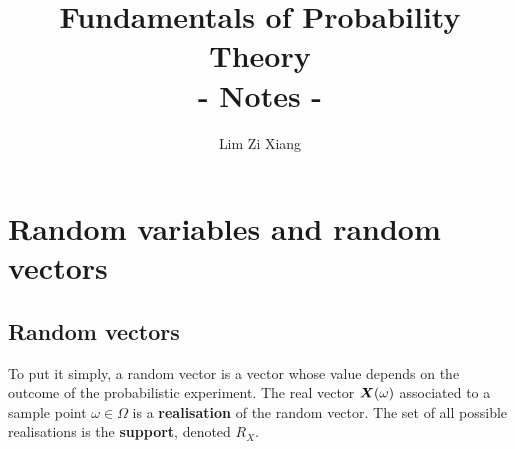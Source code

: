 \documentclass{report}
\title{\LARGE{Fundamentals of Probability Theory\\ - Notes -}}
\author{Lim Zi Xiang}
\newcommand{\Om}{\Omega}
\newcommand{\om}{\omega}
\begin{document}
	\maketitle
	\tableofcontents
	
	\chapter{Random variables and random vectors}
	
	\section{Random vectors}
	\vspace{2mm}
	To put it simply, a random vector is a vector whose value depends on the outcome of the probabilistic experiment. The real vector $\boldsymbol{X}(\omega)$ associated to a sample point $\om\in\Om$ is a \textbf{realisation} of the random vector. The set of all possible realisations is the \textbf{support}, denoted $R_X$.
	
\end{document}
